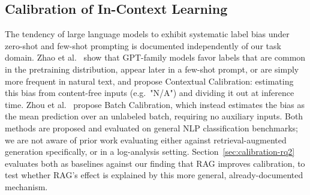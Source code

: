 \documentclass[10pt,conference]{IEEEtran}
\begin{document}
\subsection{Calibration of In-Context Learning}
The tendency of large language models to exhibit systematic label bias
under zero-shot and few-shot prompting is documented independently of
our task domain. Zhao et al.~\cite{zhao2021calibrate} show that GPT-family
models favor labels that are common in the pretraining distribution,
appear later in a few-shot prompt, or are simply more frequent in
natural text, and propose Contextual Calibration: estimating this bias
from content-free inputs (e.g.\ "N/A") and dividing it out at inference
time. Zhou et al.~\cite{zhou2024batch} propose Batch Calibration, which
instead estimates the bias as the mean prediction over an unlabeled
batch, requiring no auxiliary inputs. Both methods are proposed and
evaluated on general NLP classification benchmarks; we are not aware of
prior work evaluating either against retrieval-augmented generation
specifically, or in a log-analysis setting. Section~\ref{sec:calibration-rq2}
evaluates both as baselines against our finding that RAG improves
calibration, to test whether RAG's effect is explained by this more
general, already-documented mechanism.
\end{document}
